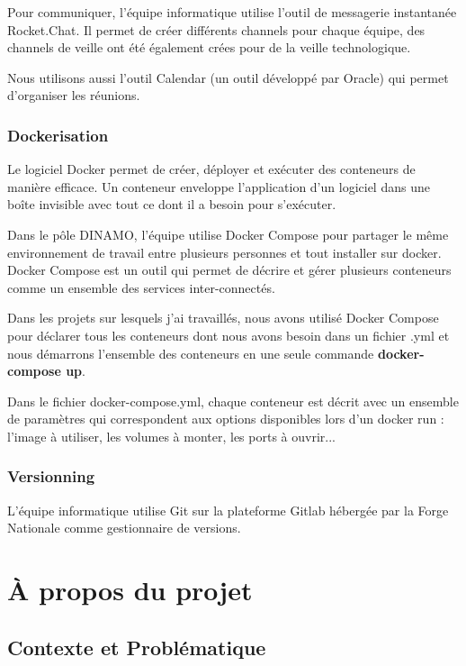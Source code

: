 \documentclass[12pt]{article}
\begin{document}
Pour communiquer, l'équipe informatique utilise l'outil de messagerie instantanée Rocket.Chat. Il permet de créer différents
channels pour chaque équipe, des channels de veille ont été également crées pour de la veille technologique.

Nous utilisons aussi l'outil Calendar (un outil développé par Oracle) qui permet d’organiser les réunions.  

\subsubsection{Dockerisation}

Le logiciel Docker permet de créer, déployer et exécuter des conteneurs de manière efficace. Un conteneur enveloppe l’application d’un logiciel dans une boîte invisible avec tout ce dont il a besoin pour s’exécuter.


Dans le pôle DINAMO, l'équipe utilise Docker Compose pour partager le même environnement de travail entre plusieurs personnes et tout installer sur docker. Docker Compose est un outil qui permet de décrire et gérer  plusieurs conteneurs comme un ensemble des services inter-connectés.

Dans les projets sur lesquels j'ai travaillés, nous avons utilisé Docker Compose pour déclarer tous les conteneurs dont nous avons besoin dans un fichier .yml  et nous démarrons l'ensemble des conteneurs en une seule commande \textbf{docker-compose up}. 

Dans le fichier docker-compose.yml, chaque conteneur est décrit avec un ensemble de paramètres qui correspondent aux options disponibles lors d’un docker run : l’image à utiliser, les volumes à monter, les ports à ouvrir...
 

\subsubsection{Versionning}

L'équipe informatique utilise Git sur la plateforme Gitlab hébergée par la Forge Nationale comme gestionnaire de versions. 

\section{À propos du projet}

\subsection{Contexte et Problématique}
\end{document}
